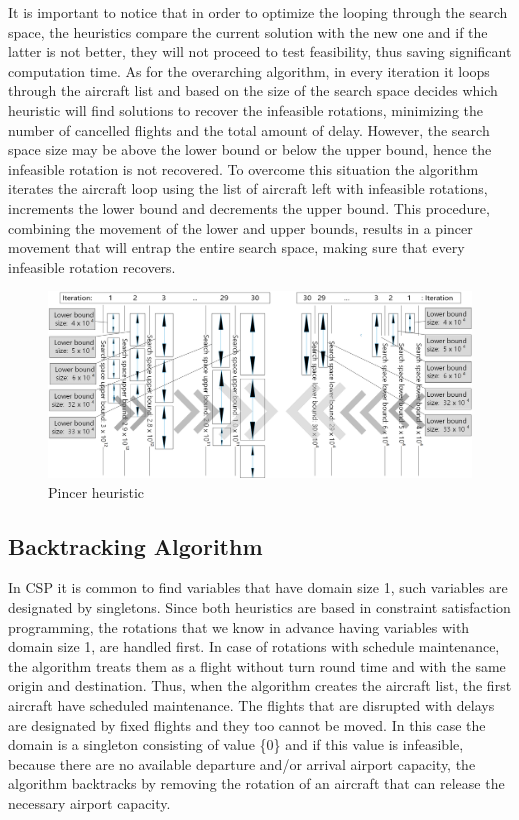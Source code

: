 It is important to notice that in order to optimize the looping through the search space, the heuristics compare the current solution with the new one and if the latter is not better, they will not proceed to test feasibility, thus saving significant computation time. 
As for the overarching algorithm, in every iteration it loops through the aircraft list and based on the size of the search space decides which heuristic will find solutions to recover the infeasible rotations, minimizing the number of cancelled flights and the total amount of delay. However, the search space size may be above the lower bound or below the upper bound, hence the infeasible rotation is not recovered. To overcome this situation the algorithm iterates the aircraft loop using the list of aircraft left with infeasible rotations, increments the lower bound %
and decrements the upper bound.%
  This procedure, combining the movement of the lower and upper bounds, results in a pincer movement that will entrap the entire search space, making sure that every infeasible rotation recovers.\\
 
 \begin{figure}[h!]
 	\centering
 	\includegraphics[scale=0.45]{figures/pincer.png}
 	\caption[]{Pincer heuristic}
 	\label{fig:pincer}
 \end{figure}
%
%
\subsection{Backtracking Algorithm} \label{sec:backtracking}

In CSP it is common to find variables that have domain size 1, such variables are designated by singletons. Since both heuristics are based in constraint satisfaction programming, the rotations that we know in advance having variables with domain size 1, are handled first. In case of rotations with schedule maintenance, the algorithm treats them as a flight without turn round time and with the same origin and destination.  Thus, when the algorithm creates the aircraft list, the first aircraft have scheduled maintenance. The flights that are disrupted with delays are designated by fixed flights and they too cannot be moved. In this case the domain is a singleton consisting of value \{0\} and if this value is infeasible, because there are no available departure and/or arrival airport capacity, the algorithm backtracks by removing the rotation of an aircraft that can release the necessary airport capacity.

